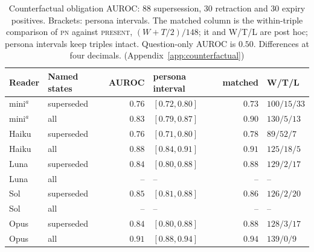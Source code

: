 \documentclass{article}
\newcommand{\present}{\textsc{present}}
\newcommand{\pn}{\textsc{pn}}
\begin{document}
\begin{table}[t]
\caption{Counterfactual obligation AUROC: $88$ supersession, $30$ retraction and $30$ expiry positives. Brackets: persona intervals. The matched column is the within-triple comparison of \pn{} against \present{}, $(W+T/2)/148$; it and W/T/L are post hoc; persona intervals keep triples intact. Question-only AUROC is $0.50$. Differences at four decimals. (Appendix~\ref{app:counterfactual})}
\label{tab:cf-main}
\centering
\scriptsize
\setlength{\tabcolsep}{3pt}
\begin{tabular}{@{}llrlrl@{}}
\toprule
Reader & Named states & AUROC & persona interval & matched & W/T/L \\
\midrule
mini$^{a}$ & superseded & $0.76$ & $[0.72,0.80]$ & $0.73$ & $100/15/33$ \\
mini$^{a}$ & all & $0.83$ & $[0.79,0.87]$ & $0.90$ & $130/5/13$ \\
Haiku & superseded & $0.76$ & $[0.71,0.80]$ & $0.78$ & $89/52/7$ \\
Haiku & all & $0.88$ & $[0.84,0.91]$ & $0.91$ & $125/18/5$ \\
Luna & superseded & $0.84$ & $[0.80,0.88]$ & $0.88$ & $129/2/17$ \\
Luna & all & -- & -- & -- & -- \\
Sol & superseded & $0.85$ & $[0.81,0.88]$ & $0.86$ & $126/2/20$ \\
Sol & all & -- & -- & -- & -- \\
Opus & superseded & $0.84$ & $[0.80,0.88]$ & $0.88$ & $128/3/17$ \\
Opus & all & $0.91$ & $[0.88,0.94]$ & $0.94$ & $139/0/9$ \\

\end{tabular}
\end{table}
\end{document}

